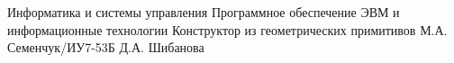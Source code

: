 \documentclass{bmstu}
\begin{document}
\makecourseworktitle
{Информатика и системы управления}
{Программное обеспечение ЭВМ и информационные технологии}
{Конструктор из геометрических примитивов}
{М.А. Семенчук/ИУ7-53Б}
{Д.А. Шибанова}
{}{}{}

\maketableofcontents











\makebibliography


\end{document}
